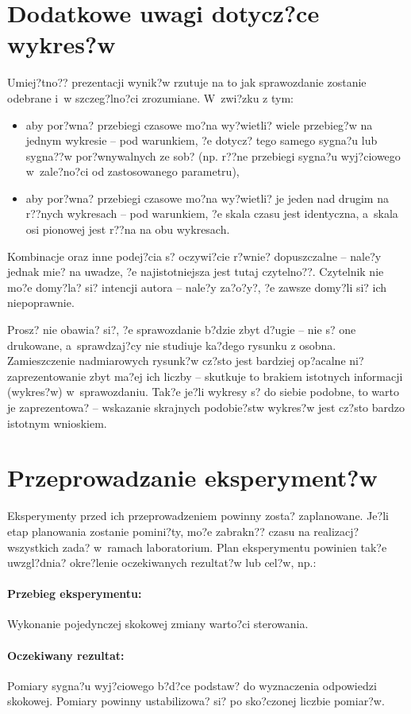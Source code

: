\section{Dodatkowe uwagi dotycz?ce wykres?w}
Umiej?tno?? prezentacji wynik?w rzutuje na to jak sprawozdanie zostanie odebrane i~w szczeg?lno?ci zrozumiane. W~zwi?zku z tym:
\begin{itemize}
	\item aby por?wna? przebiegi czasowe mo?na wy?wietli? wiele przebieg?w na jednym wykresie -- pod warunkiem, ?e dotycz? tego samego sygna?u lub sygna??w por?wnywalnych ze sob? (np. r??ne przebiegi sygna?u wyj?ciowego w~zale?no?ci od zastosowanego parametru),
	\item aby por?wna? przebiegi czasowe mo?na wy?wietli? je jeden nad drugim na r??nych wykresach -- pod warunkiem, ?e skala czasu jest identyczna, a~skala osi pionowej jest r??na na obu wykresach.
\end{itemize}
Kombinacje oraz inne podej?cia s? oczywi?cie r?wnie? dopuszczalne -- nale?y jednak mie? na uwadze, ?e najistotniejsza jest tutaj czytelno??. Czytelnik nie mo?e domy?la? si? intencji autora -- nale?y za?o?y?, ?e zawsze domy?li si? ich niepoprawnie.

Prosz? nie obawia? si?, ?e sprawozdanie b?dzie zbyt d?ugie -- nie s? one drukowane, a~sprawdzaj?cy nie studiuje ka?dego rysunku z osobna. Zamieszczenie nadmiarowych rysunk?w cz?sto jest bardziej op?acalne ni? zaprezentowanie zbyt ma?ej ich liczby -- skutkuje to brakiem istotnych informacji (wykres?w) w~sprawozdaniu. Tak?e je?li wykresy s? do siebie podobne, to warto je zaprezentowa? -- wskazanie skrajnych podobie?stw wykres?w jest cz?sto bardzo istotnym wnioskiem.

\section{Przeprowadzanie eksperyment?w}
Eksperymenty przed ich przeprowadzeniem powinny zosta? zaplanowane. Je?li etap planowania zostanie pomini?ty, mo?e zabrakn?? czasu na realizacj? wszystkich zada? w~ramach laboratorium. Plan eksperymentu powinien tak?e uwzgl?dnia? okre?lenie oczekiwanych rezultat?w lub cel?w, np.:

\paragraph{Przebieg eksperymentu:} Wykonanie pojedynczej skokowej zmiany warto?ci sterowania.
\paragraph{Oczekiwany rezultat:} Pomiary sygna?u wyj?ciowego b?d?ce podstaw? do wyznaczenia odpowiedzi skokowej. Pomiary powinny ustabilizowa? si? po sko?czonej liczbie pomiar?w.

